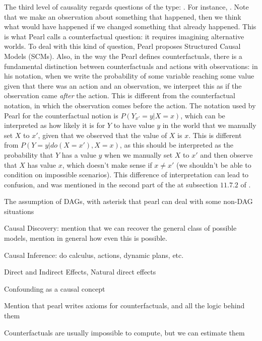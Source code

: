 The third level of causality regards questions of the type: . For instance, . Note that we make an observation about something that happened, then we think what would have happened if we changed something that already happened. This is what Pearl calls a counterfactual question: it requires imagining alternative worlds. To deal with this kind of question, Pearl proposes Structured Causal Models (SCMs). Also, in the way the Pearl defines counterfactuals, there is a fundamental distinction between counterfactuals and actions with observations: in his notation, when we write the probability of some variable reaching some value given that there was an action and an observation, we interpret this as if the observation came \textit{after} the action. This is different from the counterfactual notation, in which the observation comes before the action. The notation used by Pearl for the counterfactual notion is $P(Y_{x'} = y| X=x)$, which can be interpreted as how likely it is for $Y$ to have value $y$ in the world that we manually set $X$ to $x'$, given that we observed that the value of $X$ is $x$. This is different from $P(Y=y|do(X=x'),X=x)$, as this should be interpreted as the probability that $Y$ has a value $y$ when we manually set $X$ to $x'$ and then observe that $X$ has value $x$, which doesn't make sense if $x \neq x'$ (we shouldn't be able to condition on impossible scenarios). This difference of interpretation can lead to confusion, and was mentioned in the second part of the  at subsection $11.7.2$ of \cite{Causality}.

{\color{red} The assumption of DAGs, with asterisk that pearl can deal with some non-DAG situations}

{\color{red} Causal Discovery: mention that we can recover the general class of possible models, mention in general how even this is possible.}

{\color{red} Causal Inference: do calculus, actions, dynamic plans, etc.}

{\color{red} Direct and Indirect Effects, Natural direct effects}

{\color{red} Confounding as a causal concept}

{\color{red} Mention that pearl writes axioms for counterfactuals, and all the logic behind them}

{\color{red} Counterfactuals are usually impossible to compute, but we can estimate them}

